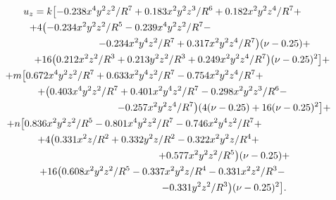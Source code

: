\begin{multline}\label{eq:ulg:ppr3}

u_z=k\bigl[

-0.238x^4 y^2 z^2/R^7+0.183x^2 y^2 z^3/R^6+0.182 x^2 y^2 z^4/R^7+\\

+4\bigl(-0.234 x^2 y^2 z^2/R^5-0.239 x^4 y^2 z^2/R^7 - \hspace{3cm} \\

\hspace{3cm}

-0.234 x^2 y^4 z^2/R^7+0.317x^2 y^2 z^4/R^7\bigr) (\nu -0.25)+

\\ 

\hspace{1.4cm}

+16\bigl(0.212 x^2 z^2/R^3+0.213 y^2 z^2/R^3+0.249 x^2 y^2 z^4/R^7\bigr) (\nu-0.25)^2 \bigr]+

\\

+m\bigl[0.672 x^4 y^2 z^2/R^7+0.633 x^2 y^4 z^2/R^7-0.754x^2 y^2 z^4/R^7+ 

\hspace{2cm}

\\

+ \bigl(0.403x^4 y^2 z^2/R^7 +0.401 x^2 y^4 z^2/R^7-0.298 x^2 y^2 z^3/R^6-

\\

\hspace{4.4cm}

-0.257 x^2 y^2 z^4/R^7\bigr)(4(\nu -0.25)+ 16 (\nu -0.25)^2\bigr]+

\\

+n\bigl[

0.836 x^2 y^2 z^2/R^5-0.801 x^4 y^2 z^2/R^7-0.746 x^2 y^4 z^2/R^7+  \hspace{2cm}

\\

+4 \bigl(0.331x^2 z/R^2+0.332 y^2 z/R^2-0.322 x^2 y^2 z/R^4 + \hspace{1cm}

\\ 

\hspace{4.4cm}

+0.577 x^2 y^2 z^2/R^5\bigr) (\nu-0.25)+ \\

 +16 \bigl(0.608 x^2 y^2 z^2/R^5-0.337 x^2 y^2 z/R^4-0.331x^2 z^2/R^3- 

\\ 

\hspace{4.4cm} -0.331y^2 z^2/R^3\bigr) (\nu -0.25)^2\bigr].

\end{multline}



